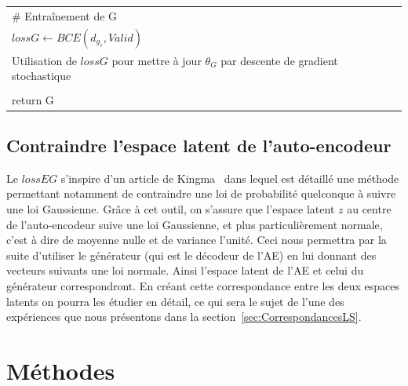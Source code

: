 \documentclass[11pt,francais]{article}
\begin{document}
\begin{table}[t!]
\begin{tabular}{l}
  \hspace{1cm}\# Entraînement de G\tabularnewline
  \hspace{1cm}\(lossG\leftarrow BCE(d_{g_z},Valid)\)\tabularnewline
  \hspace{1cm}Utilisation de \(lossG\) pour mettre à jour \(\theta_G\) par descente de gradient stochastique\tabularnewline
  \tabularnewline
  
  return G\tabularnewline
  \hline
  \end{tabular}
  \label{tab:tab2}
\end{table}


\subsection{Contraindre l'espace latent de l'auto-encodeur}
\label{sec:LatentSpace}
Le \(lossEG\) s'inspire d'un article de Kingma~\cite{kingma2013auto} dans lequel est détaillé une méthode permettant notamment de contraindre une loi de probabilité quelconque à suivre une loi Gaussienne. Grâce à cet outil, on s'assure que l'espace latent \(z\) au centre de l'auto-encodeur suive une loi Gaussienne, et plus particulièrement normale, c'est à dire de moyenne nulle et de variance l'unité. Ceci nous permettra par la suite d'utiliser le générateur (qui est le décodeur de l'AE) en lui donnant des vecteurs suivants une loi normale. Ainsi l'espace latent de l'AE et celui du générateur correspondront.
En créant cette correspondance entre les deux espaces latents on pourra les étudier en détail, ce qui sera le sujet de l'une des expériences que nous présentons dans la section~\ref{sec:CorrespondancesLS}.

\section{Méthodes}
\end{document}
